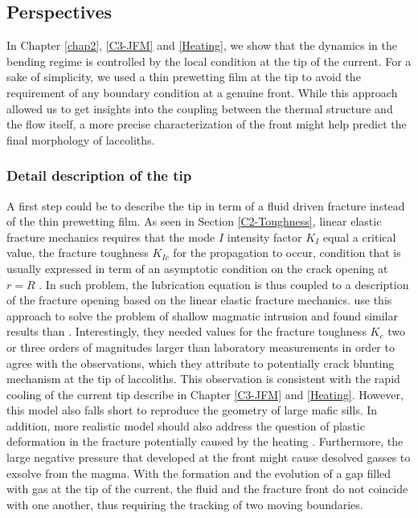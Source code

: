 \subsection*{Perspectives}
\label{sec:perspectives}

In Chapter  \ref{chap2}, \ref{C3-JFM} and \ref{Heating},  we show that
the  dynamics  in  the  bending  regime is  controlled  by  the  local
condition at  the tip of  the current.  For  a sake of  simplicity, we
used a thin prewetting film at the tip to avoid the requirement of any
boundary condition at a genuine front.  While this approach allowed us
to get  insights into the  coupling between the thermal  structure and
the flow  itself, a more  precise characterization of the  front might
help predict the final morphology of laccoliths.

\subsubsection*{Detail description of the tip}
\label{sec:caref-descr-tip}

A first step  could be to describe  the tip in term of  a fluid driven
fracture  instead of  the thin  prewetting  film. As  seen in  Section
\ref{C2-Toughness},  linear elastic  fracture mechanics  requires that
the  mode $I$  intensity  factor  $K_I$ equal  a  critical value,  the
fracture toughness  $K_{Ic}$ for  the propagation to  occur, condition
that is  usually expressed in term  of an asymptotic condition  on the
crack                 opening                 at                 $r=R$
\citep{Savitski:2002gy,Bunger:2005em,Bunger:2007vs,Detournay:2014fk}.
In  such  problem, the  lubrication  equation  is  thus coupled  to  a
description  of  the fracture  opening  based  on the  linear  elastic
fracture mechanics.  \citet{Bunger:2011cb} use  this approach to solve
the problem  of shallow magmatic  intrusion and found  similar results
than  \citet{Michaut:2011kg}.  Interestingly,  they needed  values for
the fracture toughness $K_c$ two  or three orders of magnitudes larger
than laboratory measurements in order  to agree with the observations,
which they  attribute to potentially  crack blunting mechanism  at the
tip  of laccoliths.   This observation  is consistent  with the  rapid
cooling  of  the current  tip  describe  in Chapter  \ref{C3-JFM}  and
\ref{Heating}. However, this  model also falls short  to reproduce the
geometry  of large  mafic  sills. In  addition,  more realistic  model
should  also  address  the  question of  plastic  deformation  in  the
fracture       potentially      caused       by      the       heating
\citep{Bunger:2008cl}. Furthermore,  the large negative  pressure that
developed at the front might cause desolved gasses to exsolve from the
magma.  With the formation and the  evolution of a gap filled with gas
at the  tip of the  current, the fluid and  the fracture front  do not
coincide with one  another, thus requiring the tracking  of two moving
boundaries.

